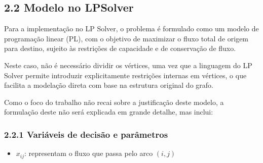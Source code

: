 \documentclass[a4paper,12pt]{article}
\begin{document}
\subsection*{2.2 Modelo no LPSolver}
Para a implementação no LP Solver, o problema é formulado como um modelo de programação linear (PL), com o objetivo de maximizar o fluxo total de origem para destino, sujeito às restrições de capacidade e de conservação de fluxo.

\vspace{0.5em}

Neste caso, não é necessário dividir os vértices, uma vez que a linguagem do LP Solver permite introduzir explicitamente restrições internas em vértices, o que facilita a modelação direta com base na estrutura original do grafo.

\vspace{0.5em}

Como o foco do trabalho não recai sobre a justificação deste modelo, a formulação deste não será explicada em grande detalhe, mas inclui:

\subsubsection*{2.2.1 Variáveis de decisão e parâmetros}
\begin{itemize}
    \item $x_{ij}$: representam o fluxo que passa pelo arco $(i,j)$
\end{itemize}
\end{document}
